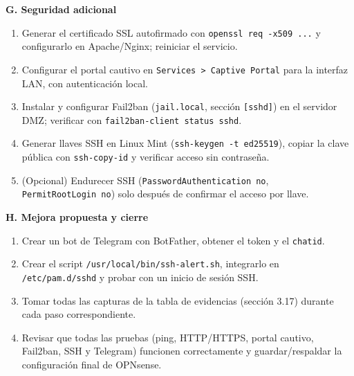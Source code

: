 \documentclass{article}
\providecommand{\tightlist}{%
  \setlength{\itemsep}{0pt}\setlength{\parskip}{0pt}}
\renewcommand{\_}{\oldunderscore\hskip0pt\relax}
\begin{document}
\textbf{G. Seguridad adicional}

\begin{enumerate}
\def\labelenumi{\arabic{enumi}.}
\setcounter{enumi}{22}
\tightlist
\item
  Generar el certificado SSL autofirmado con
  \texttt{openssl\ req\ -x509\ ...} y configurarlo en Apache/Nginx;
  reiniciar el servicio.
\item
  Configurar el portal cautivo en
  \texttt{Services\ \textgreater{}\ Captive\ Portal} para la interfaz
  LAN, con autenticación local.
\item
  Instalar y configurar Fail2ban (\texttt{jail.local}, sección
  \texttt{{[}sshd{]}}) en el servidor DMZ; verificar con
  \texttt{fail2ban-client\ status\ sshd}.
\item
  Generar llaves SSH en Linux Mint (\texttt{ssh-keygen\ -t\ ed25519}),
  copiar la clave pública con \texttt{ssh-copy-id} y verificar acceso
  sin contraseña.
\item
  (Opcional) Endurecer SSH (\texttt{PasswordAuthentication\ no},
  \texttt{PermitRootLogin\ no}) solo después de confirmar el acceso por
  llave.
\end{enumerate}

\textbf{H. Mejora propuesta y cierre}

\begin{enumerate}
\def\labelenumi{\arabic{enumi}.}
\setcounter{enumi}{27}
\tightlist
\item
  Crear un bot de Telegram con BotFather, obtener el token y el
  \texttt{chat\_id}.
\item
  Crear el script \texttt{/usr/local/bin/ssh-alert.sh}, integrarlo en
  \texttt{/etc/pam.d/sshd} y probar con un inicio de sesión SSH.
\item
  Tomar todas las capturas de la tabla de evidencias (sección 3.17)
  durante cada paso correspondiente.
\item
  Revisar que todas las pruebas (ping, HTTP/HTTPS, portal cautivo,
  Fail2ban, SSH y Telegram) funcionen correctamente y guardar/respaldar
  la configuración final de OPNsense.
\end{enumerate}
\end{document}
